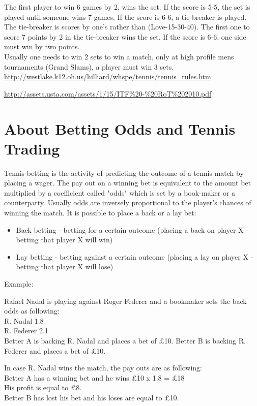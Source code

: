 \documentclass[10pt]{report}
\begin{document}
The first player to win 6 games by 2, wins the set. If the score is 5-5, the set is played until someone wins 7 games. If the score is 6-6, a tie-breaker is played.
The tie-breaker is scores by one's rather than (Love-15-30-40). The first one to score 7 points by 2 in the tie-breaker wins the set. If the score is 6-6, one side must win
by two points.  \\
Usually one needs to win 2 sets to win a match, only at high profile mens tournaments (Grand Slams), a player must win 3 sets.  \\

\url{http://westlake.k12.oh.us/hilliard/whspe/tennis/tennis_rules.htm}

\url{http://assets.usta.com/assets/1/15/ITF%20-%20RoT%202010.pdf}


\chapter{About Betting Odds and Tennis Trading}

Tennis betting is the activity of predicting the outcome of a tennis match by placing a wager.
The pay out on a winning bet is equivalent to the amount bet multiplied by a coefficient called "odds" which is set by a book-maker or a counterparty.
Usually odds are inversely proportional to the player's chances of winning the match.
It is possible to place a back or a lay bet:
\begin{itemize}
\item Back betting - betting for a certain outcome (placing a back on player X -
betting that player X will win)
\item Lay betting - betting against a certain outcome (placing a lay on player X -
betting that player X will lose)
\end{itemize}

Example: 

Rafael Nadal is playing against Roger Federer and a bookmaker sets the back odds as following:\\
R. Nadal               1.8\\
R. Federer             2.1\\

Better A is backing R. Nadal and places a bet of \pounds10. 
Better B is backing R. Federer and places a bet of \pounds 10.

In case R. Nadal wins the match, the pay outs are as following:\\
Better A has a winning bet and he wins \pounds10 x 1.8 = \pounds18\\
His profit is equal to \pounds8.\\
Better B has lost his bet and his loses are equal to \pounds10. \\
\end{document}
